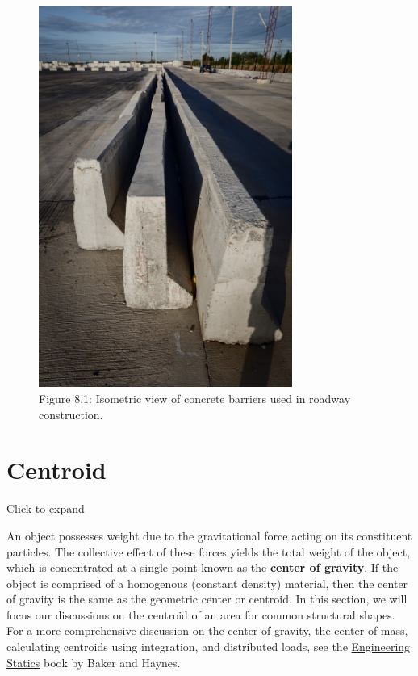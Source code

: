 \documentclass[
  letterpaper,
  DIV=11,
  numbers=noendperiod]{scrreprt}
\theoremstyle{definition}
\theoremstyle{remark}
\begin{document}
\begin{figure}[H]

{\centering \includegraphics[width=3.27083in,height=\textheight]{images/CH 8 PNGs/figure 8.1.jpg}

}

\caption{Figure 8.1: Isometric view of concrete barriers used in roadway
construction.}

\end{figure}%

\section{Centroid}\label{sec-8.1}

Click to expand

An object possesses weight due to the gravitational force acting on its
constituent particles. The collective effect of these forces yields the
total weight of the object, which is concentrated at a single point
known as the \textbf{center of gravity}. If the object is comprised of a
homogenous (constant density) material, then the center of gravity is
the same as the geometric center or centroid. In this section, we will
focus our discussions on the centroid of an area for common structural
shapes. For a more comprehensive discussion on the center of gravity,
the center of mass, calculating centroids using integration, and
distributed loads, see the
\href{https://engineeringstatics.org/Chapter_07-center-of-mass.html}{Engineering
Statics} book by Baker and Haynes.
\end{document}
